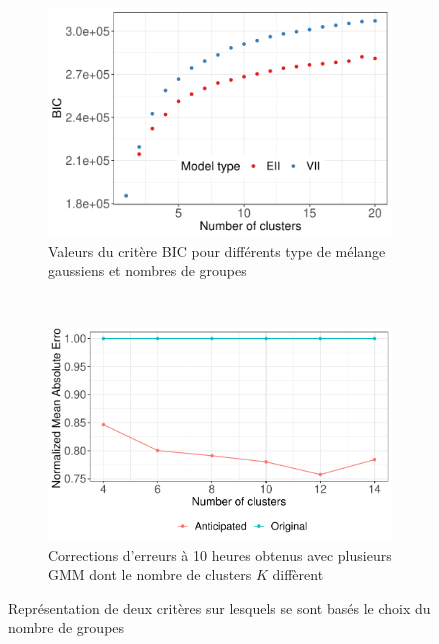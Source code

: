 \documentclass[12pt]{report}
\begin{document}
\begin{figure}[htbp]
	\begin{subfigure}{0.5\linewidth}
		\centering
		\includegraphics[width = 0.9 \linewidth]{Images/PV/GMM/GMM_BICCompare_20.pdf}
		\caption{Valeurs du critère BIC pour différents type de mélange gaussiens et nombres de groupes}
		\label{fig:PV_GMM_BIC}
	\end{subfigure}
	~
	\begin{subfigure}{0.5\linewidth}
		\centering
		\includegraphics[width = 0.9 \linewidth]{Images/PV/GMM/GMM_CompareIntraday.pdf}
		\caption{Corrections d'erreurs à 10 heures obtenus avec plusieurs GMM dont le nombre de clusters $K$ diffèrent}
		\label{fig:PV_GMM_IntradayComp}
	\end{subfigure}
	\caption{Représentation de deux critères sur lesquels se sont basés le choix du nombre de groupes}
\end{figure}
\end{document}
